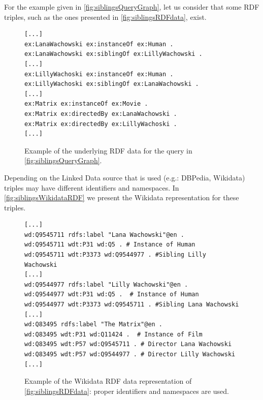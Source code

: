 For the example given in \autoref{fig:siblingsQueryGraph}, let us consider that some RDF triples, such as the ones presented in \autoref{fig:siblingsRDFdata}, exist. 

\begin{figure}[H]
\begin{verbatim}
[...]
ex:LanaWachowski ex:instanceOf ex:Human . 
ex:LanaWachowski ex:siblingOf ex:LillyWachowski . 
[...]
ex:LillyWachoski ex:instanceOf ex:Human . 
ex:LillyWachoski ex:siblingOf ex:LanaWachowski . 
[...]
ex:Matrix ex:instanceOf ex:Movie .
ex:Matrix ex:directedBy ex:LanaWachowski . 
ex:Matrix ex:directedBy ex:LillyWachoski . 
[...]
\end{verbatim}
\caption{Example of the underlying RDF data for the query in \autoref{fig:siblingsQueryGraph}.}
\label{fig:siblingsRDFdata}
\end{figure}

Depending on the Linked Data source that is used (e.g.: DBPedia, Wikidata) triples may have different identifiers and namespaces. In \autoref{fig:siblingsWikidataRDF} we present the Wikidata representation for these triples.

\begin{figure}[H]
\begin{verbatim}
[...]
wd:Q9545711 rdfs:label "Lana Wachowski"@en .
wd:Q9545711 wdt:P31 wd:Q5 . # Instance of Human
wd:Q9545711 wdt:P3373 wd:Q9544977 . #Sibling Lilly Wachowski
[...]
wd:Q9544977 rdfs:label "Lilly Wachowski"@en .
wd:Q9544977 wdt:P31 wd:Q5 .  # Instance of Human
wd:Q9544977 wdt:P3373 wd:Q9545711 . #Sibling Lana Wachowski
[...]
wd:Q83495 rdfs:label "The Matrix"@en .
wd:Q83495 wdt:P31 wd:Q11424 .  # Instance of Film
wd:Q83495 wdt:P57 wd:Q9545711 . # Director Lana Wachowski
wd:Q83495 wdt:P57 wd:Q9544977 . # Director Lilly Wachowski
[...]
\end{verbatim}
\caption{Example of the Wikidata RDF data representation of \autoref{fig:siblingsRDFdata}: proper identifiers and namespaces are used.}
\label{fig:siblingsWikidataRDF}
\end{figure}

